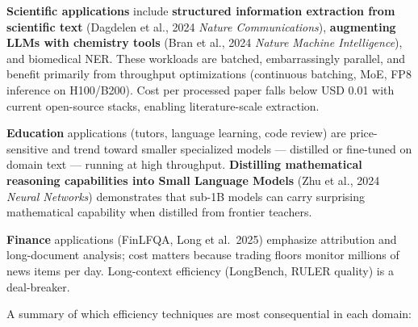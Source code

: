 \textbf{Scientific applications} include \textbf{structured information extraction from scientific text} (Dagdelen et al., 2024 \emph{Nature Communications}), \textbf{augmenting LLMs with chemistry tools} (Bran et al., 2024 \emph{Nature Machine Intelligence}), and biomedical NER. These workloads are batched, embarrassingly parallel, and benefit primarily from throughput optimizations (continuous batching, MoE, FP8 inference on H100/B200). Cost per processed paper falls below USD 0.01 with current open-source stacks, enabling literature-scale extraction.

\textbf{Education} applications (tutors, language learning, code review) are price-sensitive and trend toward smaller specialized models --- distilled or fine-tuned on domain text --- running at high throughput. \textbf{Distilling mathematical reasoning capabilities into Small Language Models} (Zhu et al., 2024 \emph{Neural Networks}) demonstrates that sub-1B models can carry surprising mathematical capability when distilled from frontier teachers.

\textbf{Finance} applications (FinLFQA, Long et al.~2025) emphasize attribution and long-document analysis; cost matters because trading floors monitor millions of news items per day. Long-context efficiency (LongBench, RULER quality) is a deal-breaker.

A summary of which efficiency techniques are most consequential in each domain:

